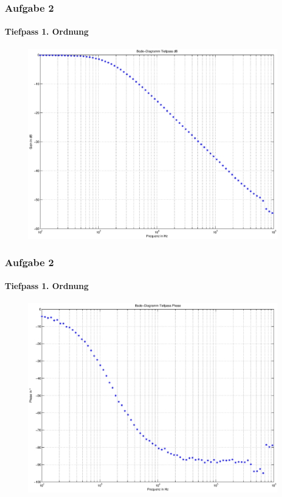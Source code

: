 \begin{frame}
\frametitle{Aufgabe 2}
\framesubtitle{Tiefpass 1. Ordnung}
\begin{figure}[H]
\begin{center}
        \includegraphics[scale=0.3]{./img/2a_bode_tief_dB.eps}
\end{center}
\end{figure}
\end{frame}
\begin{frame}
\frametitle{Aufgabe 2}
\framesubtitle{Tiefpass 1. Ordnung}
\begin{figure}[H]
\begin{center}
        \includegraphics[scale=0.3]{./img/2a_bode_tief_phase.eps}
\end{center}
\end{figure}
\end{frame}
